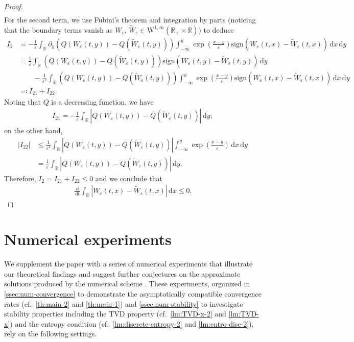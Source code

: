 \documentclass[10pt]{amsart}
\theoremstyle{plain}
\theoremstyle{definition}
\numberwithin{equation}{section}
\newcommand{\R}{\mathbb{R}}
\newcommand{\eps}{{\varepsilon}}
\newcommand{\sgn}[1]{\mathrm{sign}\left(#1\right)}
\newcommand{\dx}{{\, \mathrm{d}x}}
\newcommand{\dd}{\,\mathrm{d}}
\begin{document}
\begin{proof}
\begin{align*}
\end{align*}
For the second term, we use Fubini's theorem and integration by parts (noticing that the boundary terms vanish as $W_\eps,\,\widetilde{W}_\eps \in \mathrm{W}^{1,\infty}(\R_+\times\R)$) to deduce  
\begin{align*}
    I_2 &= -\frac1\eps \int_{\mathbb{R}} \partial_y \left( Q(W_\eps(t,y)) - Q(\widetilde{W}_\eps(t,y)) \right) \int_{-\infty}^y \exp\left(\frac{x-y}{\eps}\right) \sgn{W_\eps(t,x)-\widetilde{W}_\eps(t,x)} \dx \dd y \\
    &= \frac1\eps \int_{\mathbb{R}} \left( Q(W_\eps(t,y)) - Q(\widetilde{W}_\eps(t,y)) \right) \sgn{W_\eps(t,y)-\widetilde{W}_\eps(t,y)} \dd y \\
    &\qquad  - \frac1{\eps^2} \int_{\mathbb{R}} \left( Q(W_\eps(t,y)) - Q(\widetilde{W}_\eps(t,y)) \right) \int_{-\infty}^y \exp\left(\frac{x-y}{\eps}\right) \sgn{W_\eps(t,x)-\widetilde{W}_\eps(t,x)} \dx \dd y \\
    &\eqqcolon I_{21} + I_{22}.
\end{align*}
Noting that $Q$ is a decreasing function, we have
\begin{align*}
    I_{21} = - \frac1\eps \int_{\mathbb{R}} \left| Q(W_\eps(t,y)) - Q(\widetilde{W}_\eps(t,y)) \right| \dd y;
\end{align*}
on the other hand,
\begin{align*}
    |I_{22}| &\leq \frac1{\eps^2} \int_{\mathbb{R}} \left| Q(W_\eps(t,y)) - Q(\widetilde{W}_\eps(t,y)) \right| \int_{-\infty}^y \exp\left(\frac{x-y}{\eps}\right) \dx \dd y \\
    &= \frac1\eps \int_{\mathbb{R}} \left| Q(W_\eps(t,y)) - Q(\widetilde{W}_\eps(t,y)) \right| \dd y.
\end{align*}
Therefore, $I_2=I_{21}+I_{22}\leq0$ and we conclude that
\begin{align*}
    \frac{\dd}{\dd t} \int_{\mathbb{R}} \left|W_\eps(t,x)-\widetilde{W}_\eps(t,x)\right|\dx \leq 0.
\end{align*}
\end{proof}



\section{Numerical experiments}
\label{sec:nums}

We supplement the paper with a series of numerical experiments that illustrate our theoretical findings and suggest further conjectures on the approximate solutions produced by the numerical scheme .
These experiments, organized in \cref{ssec:num-convergence} to demonstrate the asymptotically compatible convergence rates (cf.~\cref{th:main-2} and \cref{th:main-1}) and \cref{ssec:num-stability} to investigate stability properties including the TVD property (cf.~\cref{lm:TVD-x-2} and \cref{lm:TVD-x}) and the entropy condition (cf.~\cref{lm:discrete-entropy-2} and \cref{lm:entro-disc-2}), rely on the following settings.
\end{document}
